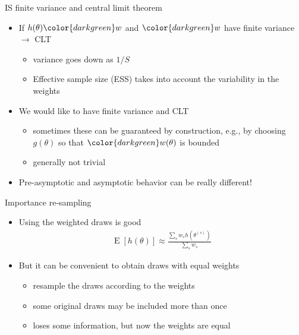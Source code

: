 \documentclass[english,t]{beamer}
\DeclareMathOperator{\E}{E}
\begin{document}
\begin{frame}{IS finite variance and central limit theorem}

  \begin{itemize}
  \item If $h(\theta){\color{darkgreen} w}$ and
    ${\color{darkgreen} w}$ have finite variance $\rightarrow$ CLT
    \begin{itemize}
    \item variance goes down as $1/S$
    \item Effective sample size (ESS) takes into account the variability in the weights
    \end{itemize}
  \item<2-> We would like to have finite variance and CLT
    \begin{itemize}
    \item sometimes these can be guaranteed by construction, e.g., by
      choosing $g(\theta)$ so that ${\color{darkgreen} w(\theta)}$ is bounded
    \item generally not trivial
    \end{itemize}
  \item<3-> Pre-asymptotic and asymptotic behavior can be really different!
  \end{itemize}
  
\end{frame}

\begin{frame}{Importance re-sampling}

  \begin{itemize}
  \item<+-> Using the weighted draws is good
    \begin{align*}
      \E[h(\theta)] \approx \frac{\sum_s w_s h(\theta^{(s)})}{\sum_s w_s}
    \end{align*}
  \item<+-> But it can be convenient to obtain draws with equal weights
    \begin{itemize}
    \item resample the draws according to the weights
    \item some original draws may be included more than once
    \item loses some information, but now the weights are equal
    \end{itemize}
  \end{itemize}

\end{frame}
\end{document}
